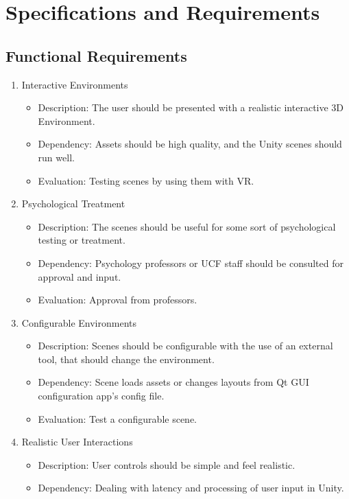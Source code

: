 \documentclass[a4paper,10pt,twoside]{article}
\begin{document}
	
	
	\pagebreak
\section{Specifications and Requirements}
	\subsection{Functional Requirements}
	\begin{enumerate}
		\item Interactive Environments
		\begin{itemize}
		\item Description: The user should be presented with a realistic interactive 3D Environment. 
		\item Dependency: Assets should be high quality, and the Unity scenes should run well.
		\item Evaluation: Testing scenes by using them with VR.
		\end{itemize}
		\item Psychological Treatment
		\begin{itemize}
		\item Description: The scenes should be useful for some sort of psychological testing or treatment.
		\item Dependency:  Psychology professors or UCF staff should be consulted for approval and input.
		\item Evaluation:  Approval from professors. 
		\end{itemize}
		\item Configurable Environments
		\begin{itemize} 
		\item Description: Scenes should be configurable with the use of an external tool, that should change the environment. 
		\item Dependency:  Scene loads assets or changes layouts from Qt GUI configuration app's config file. 
		\item Evaluation:  Test a configurable scene.
		\end{itemize}
		\item Realistic User Interactions
		\begin{itemize}
		\item Description: User controls should be simple and feel realistic. 
		\item Dependency:  Dealing with latency and processing of user input in Unity. 

\end{itemize}
\end{enumerate}
\end{document}

